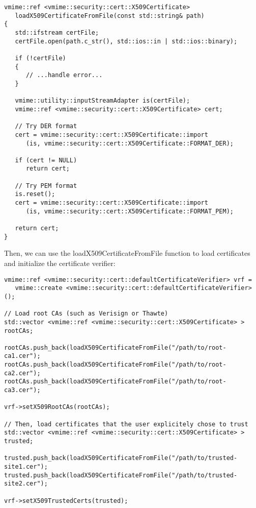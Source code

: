 \begin{lstlisting}[caption={Reading a X.509 certificate from a file}]
vmime::ref <vmime::security::cert::X509Certificate>
   loadX509CertificateFromFile(const std::string& path)
{
   std::ifstream certFile;
   certFile.open(path.c_str(), std::ios::in | std::ios::binary);

   if (!certFile)
   {
      // ...handle error...
   }

   vmime::utility::inputStreamAdapter is(certFile);
   vmime::ref <vmime::security::cert::X509Certificate> cert;

   // Try DER format
   cert = vmime::security::cert::X509Certificate::import
      (is, vmime::security::cert::X509Certificate::FORMAT_DER);

   if (cert != NULL)
      return cert;

   // Try PEM format
   is.reset();
   cert = vmime::security::cert::X509Certificate::import
      (is, vmime::security::cert::X509Certificate::FORMAT_PEM);

   return cert;
}
\end{lstlisting}

Then, we can use the {\vcode loadX509CertificateFromFile} function to load
certificates and initialize the certificate verifier:

\begin{lstlisting}[caption={Using the default certificate verifier}]
vmime::ref <vmime::security::cert::defaultCertificateVerifier> vrf =
   vmime::create <vmime::security::cert::defaultCertificateVerifier>();

// Load root CAs (such as Verisign or Thawte)
std::vector <vmime::ref <vmime::security::cert::X509Certificate> > rootCAs;

rootCAs.push_back(loadX509CertificateFromFile("/path/to/root-ca1.cer");
rootCAs.push_back(loadX509CertificateFromFile("/path/to/root-ca2.cer");
rootCAs.push_back(loadX509CertificateFromFile("/path/to/root-ca3.cer");

vrf->setX509RootCAs(rootCAs);

// Then, load certificates that the user explicitely chose to trust
std::vector <vmime::ref <vmime::security::cert::X509Certificate> > trusted;

trusted.push_back(loadX509CertificateFromFile("/path/to/trusted-site1.cer");
trusted.push_back(loadX509CertificateFromFile("/path/to/trusted-site2.cer");

vrf->setX509TrustedCerts(trusted);
\end{lstlisting}


